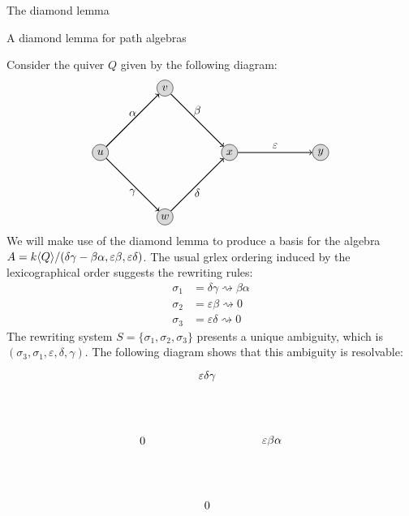 \begin{chapter}{The diamond lemma}
\begin{section}{A diamond lemma for path algebras}
\begin{exmp} Consider the quiver $Q$ given by the following diagram:
\[
\begin{tikzpicture}[->,node distance=1cm, thick]
\tikzstyle{every node} = [circle, fill=gray!30, minimum size=.5cm, inner sep=.07cm, draw=black, thin]
\node (1) at (0,0) {$u$};
\node (2) at (2,2) {$v$};
\node (3) at (2,-2) {$w$};
\node (4) at (4,0) {$x$};
\node (5) at (6.82,0) {$y$};
\tikzstyle{every node} = []
\draw (1) -- (2) node[midway, above] {$\alpha$};
\draw (2) -- (4) node[midway, above] {$\beta$};
\draw (1) -- (3) node[midway, below] {$\gamma$};
\draw (3) -- (4) node[midway, below] {$\delta$};
\draw (4) -- (5) node[midway, above] {$\varepsilon$};
\end{tikzpicture}
\]
We will make use of the diamond lemma to produce a basis for the algebra $A=k\langle Q\rangle/(\delta\gamma-\beta\alpha, \varepsilon\beta, \varepsilon\delta)$. The usual grlex ordering induced by the lexicographical order suggests the rewriting rules:
\begin{align*}
\sigma_1 &= \delta\gamma \rightsquigarrow \beta\alpha\\
\sigma_2 &= \varepsilon\beta \rightsquigarrow 0\\
\sigma_3 &= \varepsilon\delta \rightsquigarrow 0
\end{align*}
The rewriting system $S=\{\sigma_1,\sigma_2,\sigma_3\}$ presents a unique ambiguity, which is $(\sigma_3,\sigma_1, \varepsilon,\delta,\gamma)$. The following diagram shows that this ambiguity is resolvable:
\[
\begin{tikzpicture}
\node (1) at (0,0) {$\varepsilon\delta\gamma$};
\node (a1) at (-2,-2) {$0$};
\node (a2) at (2,-2) {$\varepsilon\beta\alpha$};
\node (b) at (0,-4) {$0$};


\end{tikzpicture}\]
\end{exmp}
\end{section}
\end{chapter}
